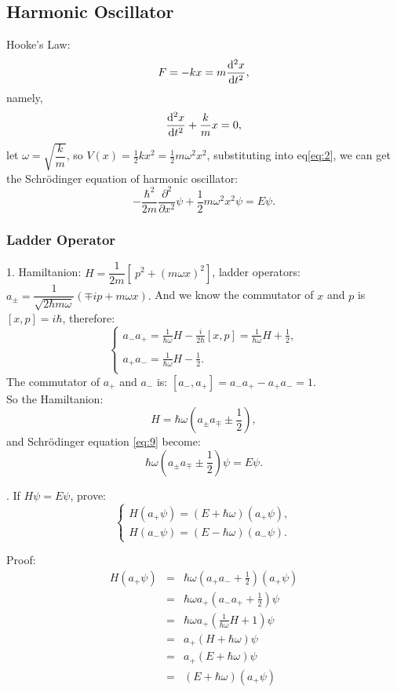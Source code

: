 \documentclass[12pt, 
]{article}
\begin{document}
	\subsection{Harmonic Oscillator}
	Hooke's Law:
	\[
		F=-kx=m\frac{{\rm d}^2x}{{\rm d}t^2},
	\]
	namely,
	\[
		\frac{{\rm d}^2 x}{{\rm d}t^2}+\frac{k}{m}x=0,
	\]
	let $\omega=\sqrt{\dfrac{k}{m}}$, so $\displaystyle V(x)=\frac{1}{2}kx^2=\frac{1}{2}m\omega^2x^2$, substituting into eq\eqref{eq:2}, we can get the Schr\"odinger equation of harmonic oscillator:
	\begin{equation}\label{eq:9}
		-\frac{\hbar^2}{2m}\frac{\partial^2}{\partial x^2}\psi+\frac{1}{2}m\omega^2x^2\psi=E\psi.
	\end{equation}
	
	\subsubsection{Ladder Operator}
	1. Hamiltanion: $H=\dfrac{1}{2m}[~p^2+(m\omega x)^2]$, ladder operators: $a_\pm=\dfrac{1}{\sqrt{2\hbar m\omega}}(\mp ip+m\omega x).$
	And we know the commutator of $x$ and $p$ is $[x,p]=i\hbar$, therefore:
	\[
		\left\{
		\begin{array}{l}
			a_{-}a_{+}=\displaystyle \frac{1}{\hbar\omega}H-\frac{i}{2\hbar}[x,p]=\frac{1}{\hbar\omega}H+\frac{1}{2},\\
			~\\
			a_+a_{-}=\displaystyle\frac{1}{\hbar\omega}H-\frac{1}{2}.\\
		\end{array}
		\right.
	\]
	The commutator of $a_{+}$ and $a_{-}$ is: $[a_{-},a_{+}]=a_{-}a_{+}-a_+a_{-}=1$.
	~\\

	\noindent So the Hamiltanion: $$H=\hbar\omega\left (a_\pm a_\mp \pm \frac{1}{2}\right),$$
	and Schr\"odinger equation \eqref{eq:9} become:
	\begin{equation}\label{eq:10}
		\hbar\omega\left (a_\pm a_\mp \pm \frac{1}{2}\right)\psi=E\psi.
	\end{equation}

	. If $H\psi=E\psi$, prove:
	\[
		\left\{
		\begin{array}{l}
			H(a_+\psi)=(E+\hbar\omega)(a_+\psi),\\
			H(a_{-}\psi)=(E-\hbar\omega)(a_{-}\psi).
		\end{array}
		\right.
	\]

\noindent Proof:
\begin{eqnarray*}
	H(a_+\psi)&=&\hbar\omega (a_+a_{-}+\frac{1}{2})(a_+\psi)\\
	&=&\hbar\omega a_+(a_{-}a_++\frac{1}{2})\psi\\
	&=&\hbar\omega a_+(\frac{1}{\hbar\omega}H+1)\psi\\
	&=&a_+(H+\hbar\omega)\psi\\
	&=&a_+(E+\hbar\omega)\psi\\
	&=&(E+\hbar\omega)(a_+\psi)
\end{eqnarray*}
\end{document}
